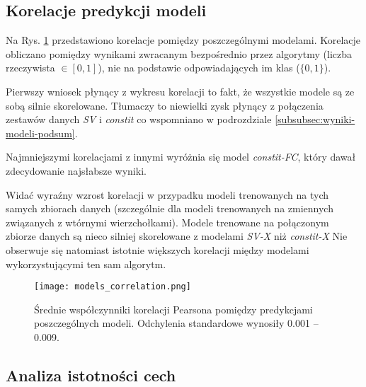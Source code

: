 \subsection{Korelacje predykcji modeli}

Na Rys. \ref{fig:models_corr} przedstawiono korelacje pomiędzy poszczególnymi modelami. Korelacje obliczano pomiędzy wynikami zwracanym bezpośrednio przez algorytmy (liczba rzeczywista $\in [0,1]$), nie na podstawie odpowiadających im klas ($\{0,1\}$).

Pierwszy wniosek płynący z wykresu korelacji to fakt, że wszystkie modele są ze sobą silnie skorelowane. Tłumaczy to niewielki zysk płynący z połączenia zestawów danych \textit{SV} i \textit{constit} co wspomniano w podrozdziale \ref{subsubsec:wyniki-modeli-podsum}.

Najmniejszymi korelacjami z innymi wyróżnia się model \textit{constit-FC}, który dawał zdecydowanie najsłabsze wyniki.

Widać wyraźny wzrost korelacji w przypadku modeli trenowanych na tych samych zbiorach danych (szczególnie dla modeli trenowanych na zmiennych związanych z wtórnymi wierzchołkami). 
Modele trenowane na połączonym zbiorze danych są nieco silniej skorelowane z modelami \textit{SV-X} niż \textit{constit-X}
Nie obserwuje się natomiast istotnie większych korelacji między modelami wykorzystującymi ten sam algorytm.

\begin{figure}[ht]
	\centering
	\texttt{[image: models\_correlation.png]}
	\caption{Średnie współczynniki korelacji Pearsona pomiędzy predykcjami poszczególnych modeli. Odchylenia standardowe wynosiły 0.001 -- 0.009.}
	\label{fig:models_corr}
\end{figure}

\FloatBarrier
\subsection{Analiza istotności cech}



\newlength{\everyNthRowSpace}
\setlength{\everyNthRowSpace}{10pt}


